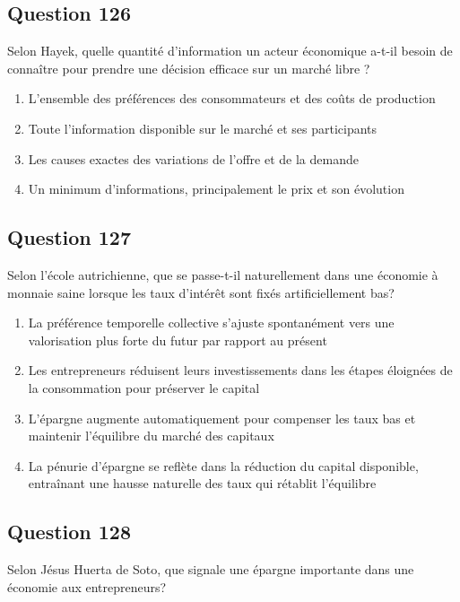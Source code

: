 \documentclass[12pt,a4paper]{article}
\begin{document}
\bigskip


\subsection*{Question 126}
Selon Hayek, quelle quantité d'information un acteur économique a-t-il besoin de connaître pour prendre une décision efficace sur un marché libre ?

\begin{enumerate}[label=\Alph*., leftmargin=*]
\item L'ensemble des préférences des consommateurs et des coûts de production
\item Toute l'information disponible sur le marché et ses participants
\item Les causes exactes des variations de l'offre et de la demande
\item Un minimum d'informations, principalement le prix et son évolution
\end{enumerate}

\bigskip


\subsection*{Question 127}
Selon l'école autrichienne, que se passe-t-il naturellement dans une économie à monnaie saine lorsque les taux d'intérêt sont fixés artificiellement bas?

\begin{enumerate}[label=\Alph*., leftmargin=*]
\item La préférence temporelle collective s'ajuste spontanément vers une valorisation plus forte du futur par rapport au présent
\item Les entrepreneurs réduisent leurs investissements dans les étapes éloignées de la consommation pour préserver le capital
\item L'épargne augmente automatiquement pour compenser les taux bas et maintenir l'équilibre du marché des capitaux
\item La pénurie d'épargne se reflète dans la réduction du capital disponible, entraînant une hausse naturelle des taux qui rétablit l'équilibre
\end{enumerate}

\bigskip


\subsection*{Question 128}
Selon Jésus Huerta de Soto, que signale une épargne importante dans une économie aux entrepreneurs?
\end{document}

